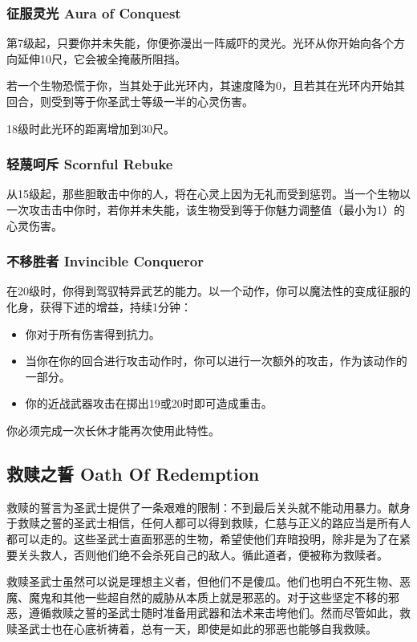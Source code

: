 \subsubsection{征服灵光 Aura of Conquest}第7级起，只要你并未失能，你便弥漫出一阵威吓的灵光。光环从你开始向各个方向延伸10尺，它会被全掩蔽所阻挡。

若一个生物恐慌于你，当其处于此光环内，其速度降为0，且若其在光环内开始其回合，则受到等于你圣武士等级一半的心灵伤害。

18级时此光环的距离增加到30尺。

\subsubsection{轻蔑呵斥 Scornful Rebuke}从15级起，那些胆敢击中你的人，将在心灵上因为无礼而受到惩罚。当一个生物以一次攻击击中你时，若你并未失能，该生物受到等于你魅力调整值（最小为1）的心灵伤害。

\subsubsection{不移胜者 Invincible Conqueror}在20级时，你得到驾驭特异武艺的能力。以一个动作，你可以魔法性的变成征服的化身，获得下述的增益，持续1分钟：
\begin{itemize}
\item 你对于所有伤害得到抗力。
\item 当你在你的回合进行攻击动作时，你可以进行一次额外的攻击，作为该动作的一部分。
\item 你的近战武器攻击在掷出19或20时即可造成重击。
\end{itemize}

你必须完成一次长休才能再次使用此特性。


\subsection{救赎之誓 Oath Of Redemption}救赎的誓言为圣武士提供了一条艰难的限制：不到最后关头就不能动用暴力。献身于救赎之誓的圣武士相信，任何人都可以得到救赎，仁慈与正义的路应当是所有人都可以走的。这些圣武士直面邪恶的生物，希望使他们弃暗投明，除非是为了在紧要关头救人，否则他们绝不会杀死自己的敌人。循此道者，便被称为救赎者。

救赎圣武士虽然可以说是理想主义者，但他们不是傻瓜。他们也明白不死生物、恶魔、魔鬼和其他一些超自然的威胁从本质上就是邪恶的。对于这些坚定不移的邪恶，遵循救赎之誓的圣武士随时准备用武器和法术来击垮他们。然而尽管如此，救赎圣武士也在心底祈祷着，总有一天，即使是如此的邪恶也能够自我救赎。

